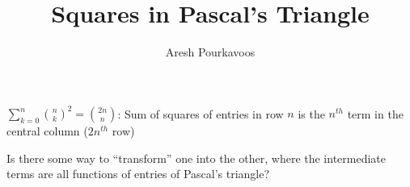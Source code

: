 \documentclass{article}
\begin{document}
\title{Squares in Pascal's Triangle}
\author{Aresh Pourkavoos}
\maketitle

$\sum\limits_{k=0}^{n}{n \choose k}^2 = {2n \choose n}$:
Sum of squares of entries in row $n$ is
the $n^{th}$ term in the central column ($2n^{th}$ row)

Is there some way to ``transform'' one into the other,
where the intermediate terms are all
functions of entries of Pascal's triangle?
\end{document}
